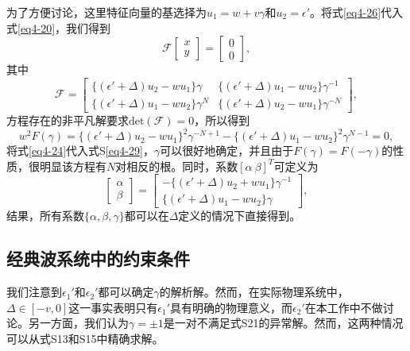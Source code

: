 为了方便讨论，这里特征向量的基选择为\(u_{1}=w + v\gamma\)和\(u_{2}=\epsilon'\)。将式\ref{eq4-26}代入式\ref{eq4-20}，我们得到
\begin{equation}\label{eq4-27}
    \mathcal{F}\begin{bmatrix}x\\y\end{bmatrix}=\begin{bmatrix}0\\0\end{bmatrix},
\end{equation}
其中
\begin{equation}\label{eq4-28}
    \mathcal{F}=\begin{bmatrix}\{(\epsilon'+\Delta)u_{2}-wu_{1}\}\gamma&\{(\epsilon'+\Delta)u_{1}-wu_{2}\}\gamma^{-1}\\\{(\epsilon'+\Delta)u_{1}-wu_{2}\}\gamma^{N}&\{(\epsilon'+\Delta)u_{2}-wu_{1}\}\gamma^{-N}\end{bmatrix},
\end{equation}
方程存在的非平凡解要求\(\mathrm{det}(\mathcal{F}) = 0\)，所以得到
\begin{equation}\label{eq4-29}
    w^{2}F(\gamma)=\{(\epsilon'+\Delta)u_{2}-wu_{1}\}^{2}\gamma^{-N + 1}-\{(\epsilon'+\Delta)u_{1}-wu_{2}\}^{2}\gamma^{N - 1}=0,
\end{equation}
将式\ref{eq4-24}代入式S\ref{eq4-29}，\(\gamma\)可以很好地确定，并且由于\(F(\gamma)=F(-\gamma)\)的性质，很明显该方程有\(N\)对相反的根。同时，系数\([\alpha\ \beta]^{T}\)可定义为
\begin{equation}\label{eq4-30}
    \begin{bmatrix}\alpha\\\beta\end{bmatrix}=\begin{bmatrix}-\{(\epsilon'+\Delta)u_{2}+wu_{1}\}\gamma^{-1}\\\{(\epsilon'+\Delta)u_{1}-wu_{2}\}\gamma\end{bmatrix},
\end{equation}
结果，所有系数\(\{\alpha,\beta,\gamma\}\)都可以在\(\Delta\)定义的情况下直接得到。

\subsection{经典波系统中的约束条件}

我们注意到\(\epsilon_{1}'\)和\(\epsilon_{2}'\)都可以确定\(\gamma\)的解析解。然而，在实际物理系统中，\(\Delta\in[-v,0]\)这一事实表明只有\(\epsilon_{1}'\)具有明确的物理意义，而\(\epsilon_{2}'\)在本工作中不做讨论。另一方面，我们认为\(\gamma=\pm1\)是一对不满足式S21的异常解。然而，这两种情况可以从式S13和S15中精确求解。

